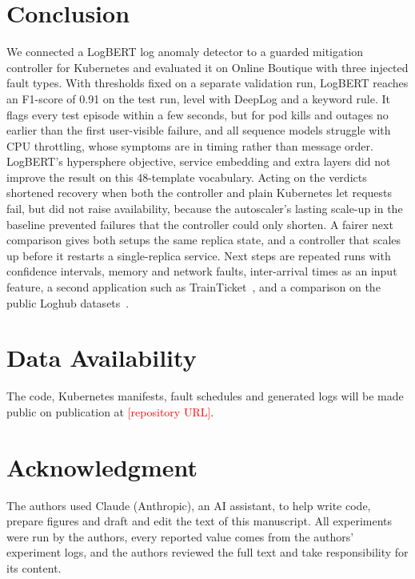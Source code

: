 \documentclass[journal]{IEEEtran}
\newcommand{\pending}[1]{\textcolor{red}{[#1]}}
\begin{document}
\section{Conclusion}
We connected a LogBERT log anomaly detector to a guarded mitigation controller for Kubernetes and evaluated it on Online Boutique with three injected fault types. With thresholds fixed on a separate validation run, LogBERT reaches an F1-score of 0.91 on the test run, level with DeepLog and a keyword rule. It flags every test episode within a few seconds, but for pod kills and outages no earlier than the first user-visible failure, and all sequence models struggle with CPU throttling, whose symptoms are in timing rather than message order. LogBERT's hypersphere objective, service embedding and extra layers did not improve the result on this 48-template vocabulary. Acting on the verdicts shortened recovery when both the controller and plain Kubernetes let requests fail, but did not raise availability, because the autoscaler's lasting scale-up in the baseline prevented failures that the controller could only shorten. A fairer next comparison gives both setups the same replica state, and a controller that scales up before it restarts a single-replica service. Next steps are repeated runs with confidence intervals, memory and network faults, inter-arrival times as an input feature, a second application such as TrainTicket~\cite{zhou2021}, and a comparison on the public Loghub datasets~\cite{zhu2023}.

\section*{Data Availability}
The code, Kubernetes manifests, fault schedules and generated logs will be made public on publication at \pending{repository URL}.

\section*{Acknowledgment}
The authors used Claude (Anthropic), an AI assistant, to help write code, prepare figures and draft and edit the text of this manuscript. All experiments were run by the authors, every reported value comes from the authors' experiment logs, and the authors reviewed the full text and take responsibility for its content.
\end{document}
